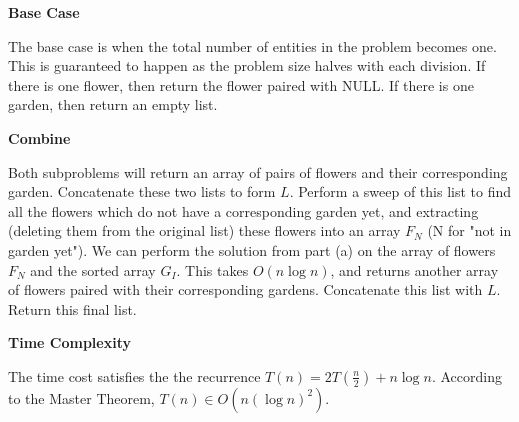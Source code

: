 \documentclass{article}
\begin{document}
\begin{solution}
\begin{enumerate}[label = (\alph*)]
    \pagebreak

    \textbf{Base Case}

    The base case is when the total number of entities in the problem becomes one.
    This is guaranteed to happen as the problem size halves with each division.
    If there is one flower, then return the flower paired with \textsc{NULL}. 
    If there is one garden, then return an empty list.

    \textbf{Combine}

    Both subproblems will return an array of pairs of flowers and their corresponding garden.
    Concatenate these two lists to form $L$. Perform a sweep of this list to find all the flowers which do not have a corresponding garden yet,
    and extracting (deleting them from the original list) these flowers into an array $F_N$ (N for "not in garden yet").
    We can perform the solution from part (a) on the array of flowers $F_N$ and the sorted array $G_I$.
    This takes $O(n\log n)$, and returns another array of flowers paired with their corresponding gardens.
    Concatenate this list with $L$. Return this final list.

    \textbf{Time Complexity}

    The time cost satisfies the the recurrence $T(n)=2T(\frac{n}{2}) + n\log n$.
    According to the Master Theorem, $T(n)\in O(n(\log n)^2)$.


\end{enumerate}
\end{solution}
\end{document}
